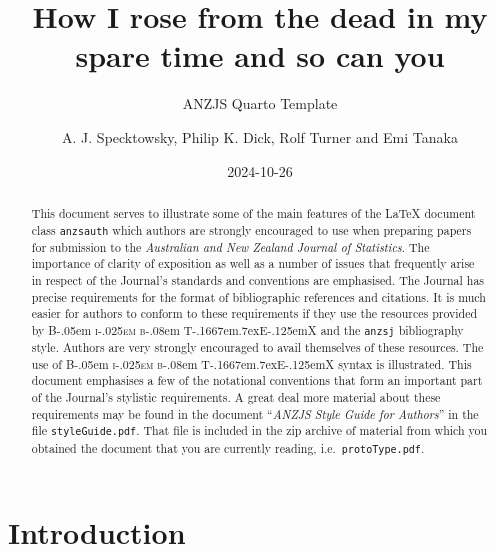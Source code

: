 \documentclass[
  times,
  doublespace]{anzsauth}
\title{How I rose from the dead in my spare time and so can you}
\subtitle{ANZJS Quarto Template}
\author{
A. J. Specktowsky\addressnum{1},
Philip K. Dick\addressnum{2},
Rolf Turner\addressnum{3} and 
Emi Tanaka
\addressnum{4}\corrauth
}
\affiliation{
School of Hard Knocks, 
School of Design Terrace, 
University of Auckland and 
The Australian National University
}
\date{2024-10-26}
\newcommand\BibTeX{{\rmfamily B\kern-.05em \textsc{i\kern-.025em b}\kern-.08em
T\kern-.1667em\lower.7ex\hbox{E}\kern-.125emX}}
\begin{document}
\begin{abstract}
This document serves to illustrate some of the main features of the
\LaTeX{} document class \texttt{anzsauth} which authors are strongly
encouraged to use when preparing papers for submission to the
\emph{Australian and New Zealand Journal of Statistics}. The importance
of clarity of exposition as well as a number of issues that frequently
arise in respect of the Journal's standards and conventions are
emphasised. The Journal has precise requirements for the format of
bibliographic references and citations. It is much easier for authors to
conform to these requirements if they use the resources provided by
\BibTeX{} and the \texttt{anzsj} bibliography style. Authors are very
strongly encouraged to avail themselves of these resources. The use of
\BibTeX{} syntax is illustrated. This document emphasises a few of the
notational conventions that form an important part of the Journal's
stylistic requirements. A great deal more material about these
requirements may be found in the document ``\emph{ANZJS Style Guide for
Authors}'' in the file \texttt{styleGuide.pdf}. That file is included in
the zip archive of material from which you obtained the document that
you are currently reading, i.e.~\texttt{protoType.pdf}.
\end{abstract}

          

\maketitle

\section{Introduction}\label{sec-intro}
\end{document}
